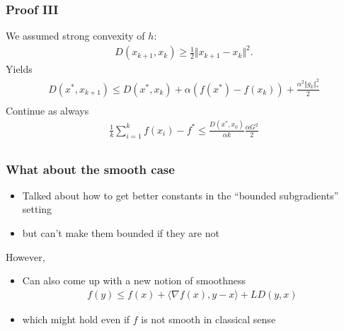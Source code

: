 \documentclass{beamer}
\begin{document}
\begin{frame}
  \frametitle{Proof III}
  We assumed strong convexity of $h$:
  \begin{align}
    D(x_{k+1}, x_k) \ge \frac12 \Vert x_{k+1}-x_k \Vert^2.
  \end{align}
  Yields
  \begin{align}
    D(x^*, x_{k+1}) \le  D(x^*, x_k) + \alpha (f(x^*)-f(x_k))  + \frac{\alpha^2 \Vert g_k \Vert_*^2}{2} \\
  \end{align}
  Continue as always
  \begin{align}
    \frac{1}{k} \sum_{i=1}^{k} f(x_i) - f^* \le \frac{D(x^*, x_0)}{\alpha k}
    \frac{\alpha G^2}{2} \\
  \end{align}
\end{frame}


\begin{frame}
  \frametitle{What about the smooth case}

  \begin{itemize}
    \item Talked about how to get better constants in the ``bounded subgradients'' setting
    \item but can't make them bounded if they are not
  \end{itemize}
  However,
  \begin{itemize}
    \item Can also come up with a new notion of smoothness
          \begin{align}
            f(y) \le f(x) + \langle \nabla f(x), y-x \rangle + L D(y, x)
          \end{align}
    \item which might hold even if $f$ is not smooth in classical sense
  \end{itemize}
\end{frame}
\end{document}
